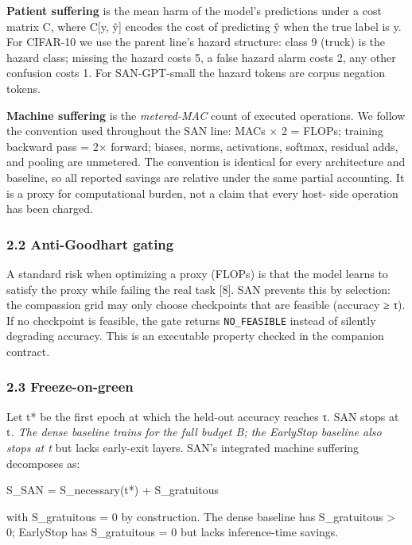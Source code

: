 \documentclass[
]{article}
\begin{document}
\textbf{Patient suffering} is the mean harm of the model's predictions
under a cost matrix C, where C{[}y, ŷ{]} encodes the cost of predicting
ŷ when the true label is y. For CIFAR-10 we use the parent line's hazard
structure: class 9 (truck) is the hazard class; missing the hazard costs
5, a false hazard alarm costs 2, any other confusion costs 1. For
SAN-GPT-small the hazard tokens are corpus negation tokens.

\textbf{Machine suffering} is the \emph{metered-MAC} count of executed
operations. We follow the convention used throughout the SAN line: MACs
× 2 = FLOPs; training backward pass = 2× forward; biases, norms,
activations, softmax, residual adds, and pooling are unmetered. The
convention is identical for every architecture and baseline, so all
reported savings are relative under the same partial accounting. It is a
proxy for computational burden, not a claim that every host- side
operation has been charged.

\hypertarget{anti-goodhart-gating}{%
\subsubsection{2.2 Anti-Goodhart gating}\label{anti-goodhart-gating}}

A standard risk when optimizing a proxy (FLOPs) is that the model learns
to satisfy the proxy while failing the real task {[}8{]}. SAN prevents
this by selection: the compassion grid may only choose checkpoints that
are feasible (accuracy ≥ τ). If no checkpoint is feasible, the gate
returns \texttt{NO\_FEASIBLE} instead of silently degrading accuracy.
This is an executable property checked in the companion contract.

\hypertarget{freeze-on-green}{%
\subsubsection{2.3 Freeze-on-green}\label{freeze-on-green}}

Let t* be the first epoch at which the held-out accuracy reaches τ. SAN
stops at t\emph{. The dense baseline trains for the full budget B; the
EarlyStop baseline also stops at t} but lacks early-exit layers. SAN's
integrated machine suffering decomposes as:

S\_SAN = S\_necessary(t*) + S\_gratuitous

with S\_gratuitous = 0 by construction. The dense baseline has
S\_gratuitous \textgreater{} 0; EarlyStop has S\_gratuitous = 0 but
lacks inference-time savings.
\end{document}
